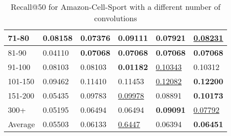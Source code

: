 \begin{table*}[]
\begin{tabular}{|l|l|l|l|l|l|}
        71-80     & 0.08158                    & 0.07376                    & \textbf{0.09111}           & 0.07921                    & \underline{0.08231}        \\ \hline
        81-90     & 0.04110                    & \textbf{0.07068}           & \textbf{0.07068}           & \textbf{0.07068}           & \textbf{0.07068}           \\ \hline
        91-100    & 0.08103                    & 0.08103                    & \textbf{0.01182}           & \underline{0.10343}        & 0.10312                    \\ \hline
        101-150   & 0.09462                    & 0.11410                    & 0.11453                    & \underline{0.12082}        & \textbf{0.12200}           \\ \hline
        151-200   & 0.05435                    & 0.09783                    & \underline{0.09978}        & 0.08891                    & \textbf{0.10173}           \\ \hline
        300+      & 0.05195                    & 0.06494                    & 0.06494                    & \textbf{0.09091}           & \underline{0.07792}        \\ \hline
        Average   & 0.05503                    & 0.06133                    & \underline{0.6447}         & 0.06394                    & \textbf{0.06451}           \\ \hline
    \end{tabular}
    \caption{Recall@50 for Amazon-Cell-Sport with a different number of convolutions}
    \centering
    \label{tab:Amazon-Cell-Sport-recall-evaluation-mean}
\end{table*}

